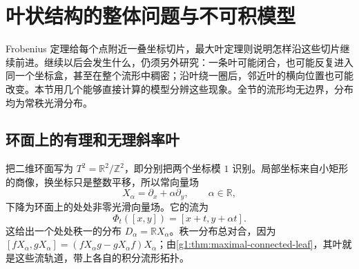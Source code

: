 
% 
% 
% 

\section{叶状结构的整体问题与不可积模型}
\label{g1:sec:1305}

Frobenius 定理给每个点附近一叠坐标切片，最大叶定理则说明怎样沿这些切片继续前进。继续以后会发生什么，仍须另外研究：一条叶可能闭合，也可能反复进入同一个坐标盒，甚至在整个流形中稠密；沿叶绕一圈后，邻近叶的横向位置也可能改变。本节用几个能够直接计算的模型分辨这些现象。全节的流形均无边界，分布均为常秩光滑分布。

\subsection{环面上的有理和无理斜率叶}
\label{g1:subsec:1305:01}

把二维环面写为 \(T^2=\mathbb R^2/\mathbb Z^2\)，即分别把两个坐标模 \(1\) 识别。局部坐标来自小矩形的商像，换坐标只是整数平移，所以常向量场
\[
	X_\alpha=\partial_x+\alpha\partial_y,\qquad \alpha\in\mathbb R,
\]
下降为环面上的处处非零光滑向量场。它的流为
\[
	\Phi_t([x,y])=[x+t,y+\alpha t].
\]
这给出一个处处秩一的分布 \(D_\alpha=\mathbb RX_\alpha\)。秩一分布总对合，因为 \([fX_\alpha,gX_\alpha]=(fX_\alpha g-gX_\alpha f)X_\alpha\)；由\cref{g1:thm:maximal-connected-leaf}，其叶就是这些流轨道，带上各自的积分流形拓扑。


